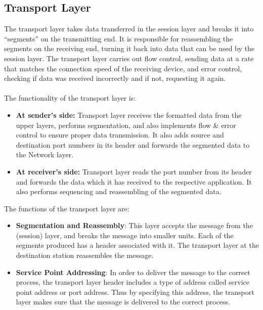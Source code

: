 \documentclass{article}
\begin{document}
    \subsection{Transport Layer}
    The transport layer takes data transferred in the session layer and breaks it into “segments” on the transmitting end. It is responsible for reassembling the segments on the receiving end, turning it back into data that can be used by the session layer. The transport layer carries out flow control, sending data at a rate that matches the connection speed of the receiving device, and error control, checking if data was received incorrectly and if not, requesting it again. \\ \\
    The functionality of the transport layer is:
    \begin{itemize}
        \item \textbf{At sender’s side:} Transport layer receives the formatted data from the upper layers, performs segmentation, and also implements flow \& error control to ensure proper data transmission. It also adds source and destination port numbers in its header and forwards the segmented data to the Network layer. 
        \item \textbf{At receiver’s side:} Transport layer reads the port number from its header and forwards the data which it has received to the respective application. It also performs sequencing and reassembling of the segmented data.
    \end{itemize}
    The functions of the transport layer are:
    \begin{itemize}
        \item \textbf{Segmentation and Reassembly}: This layer accepts the message from the (session) layer, and breaks the message into smaller units. Each of the segments produced has a header associated with it. The transport layer at the destination station reassembles the message.
        \item \textbf{Service Point Addressing}: In order to deliver the message to the correct process, the transport layer header includes a type of address called service point address or port address. Thus by specifying this address, the transport layer makes sure that the message is delivered to the correct process.
    \end{itemize}
    
\end{document}
